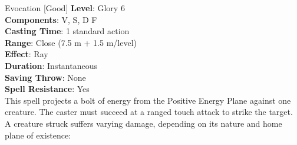 {Evocation [Good]}
{
	\textbf{Level}: Glory 6\\
	\textbf{Components}: V, S, D F\\
	\textbf{Casting Time}: 1 standard action\\
	\textbf{Range}: Close (7.5 m + 1.5 m/level)\\
	\textbf{Effect}: Ray\\
	\textbf{Duration}: Instantaneous\\
	\textbf{Saving Throw}: None\\
	\textbf{Spell Resistance}: Yes\\
}
{
	This spell projects a bolt of energy from the Positive Energy Plane against one creature. The caster must succeed at a ranged touch attack to strike the target. A creature struck suffers varying damage, depending on its nature and home plane of existence:\\

}